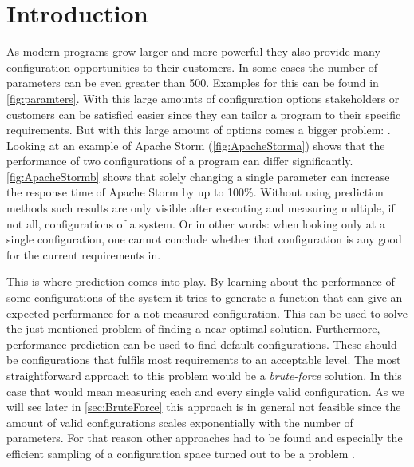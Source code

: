 
\section{Introduction} \label{sec:introduction}

As modern programs grow larger and more powerful they also provide many configuration opportunities to their customers. In some cases the number of parameters can be even greater than 500. Examples for this can be found in \cref{fig:paramters}. With this large amounts of configuration options stakeholders or customers can be satisfied easier since they can tailor a program to their specific requirements. But with this large amount of options comes a bigger problem: . Looking at an example of Apache Storm (\cref{fig:ApacheStorma}) shows that the performance of two configurations of a program can differ significantly. \cref{fig:ApacheStormb} shows that solely changing a single parameter can increase the response time of Apache Storm by up to 100\%. Without using prediction methods such results are only visible after executing and measuring multiple, if not all, configurations of a system. Or in other words: when looking only at a single configuration, one cannot conclude whether that configuration is any good for the current requirements in.

This is where prediction comes into play. By learning about the performance of some configurations of the system it tries to generate a function that can give an expected performance for a not measured configuration. This can be used to solve the just mentioned problem of finding a near optimal solution.
Furthermore, performance prediction can be used to find default configurations. These should be configurations that fulfils most requirements to an acceptable level. 
The most straightforward  approach to this problem would be a \textit{brute-force} solution. In this case that would mean measuring each and every single valid configuration. As we will see later in \cref{sec:BruteForce} this approach is in general not feasible since the amount of valid configurations scales exponentially with the number of parameters. For that reason other approaches had to be found and especially the efficient sampling of a configuration space turned out to be a problem \cite{CostEfficientSampling_Gou_Siegmund_2015}.

